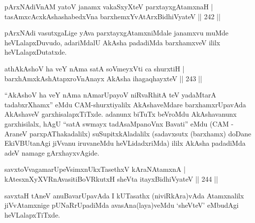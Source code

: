 \begin{shl}
pArxNAdiVnAM yatoV janamx vakaSxyXteV parxtayxgAtamxnaH |\\
tasAmxcAcx\s \s kAshashabedxVna barxhemxYvAtArxBidhiVyateV \hfill || 242 ||
\end{shl}

\begin{artha}
pArxNAdi vasutxgaLige yAva parxtayxgAtamxniMdale janamxvu muMde heVLalapxDuvudo, adariMdalU AkAsha padadiMda barxhamxveV ililx heVLalapxDutatxde.
\end{artha}


\begin{shl}
athA\s \s kAshoV ha veY nAma satA soVmeyxVti ca shurxtiH |\\
barxhAmxkAshAtapxroV\footnotemark[1] nAnayx AkAsha iha\footnotemark[2] gaqhayxteV \hfill || 243 ||
\end{shl}

\begin{artha}
``AkAshoV ha veY nAma nAmarUpayoV niRvaRhitA teV yadaMtarA tadabxrXhamx'' eMdu CAM-shurxtiyalilx  AkAshaveMdare barxhamxrUpavAda AkAshaveV garxhisalapxTiTxde. adanunx biTuTx beVroMdu AkAshavanunx garxhisilalx, hAgU ``satA swmayx tadAsaMpanoVnx Bavati'' eMdu (CAM - AraneV parxpAThakadalilx) suSupitxkAladalilx (sadavxsutx (barxhamx) doDane EkiVBUtanAgi jiVvanu iruvaneMdu heVLidadxriMda) ililx AkAsha padadiMda adeV namage gArxhayxvAgide.
\end{artha}


\begin{shl}
savxtoVvagamarUpeV\s simxnUkxTasethxV kAraNAtamxnA |\\
kAtesxnXyXVRnAvasitiBoVRkutxH sheVta itayxBidhiVyateV \hfill || 244 ||
\end{shl}

\begin{artha}
savxtaH tAneV anuBavarUpavAda I kUTasathx (niviRkAra)vAda Atamxnalilx jiVvAtamxnige pUNaRrUpadiMda avasAna(laya)veMdu `sheVteV' eMbudAgi heVLalapxTiTxde.
\end{artha}

